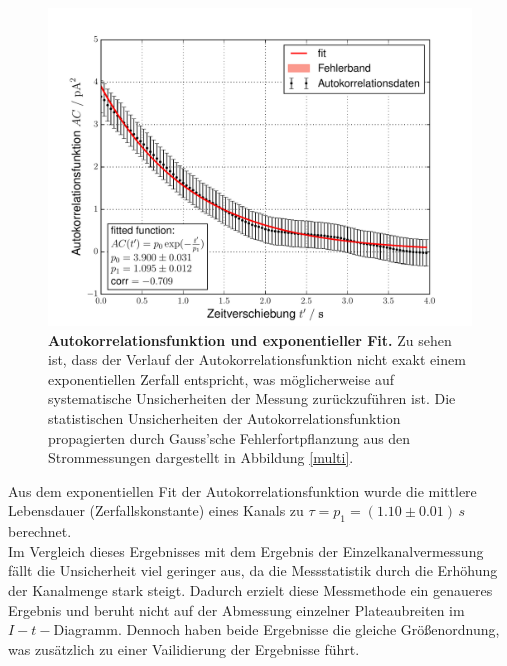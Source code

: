 \documentclass{include/thesisclass3}
\newcommand{\e}[1]{\,\si{#1}}
\begin{document}
\begin{figure}[H]
\centering
\includegraphics[scale=0.7]{images/AC.pdf}
\caption{\textbf{Autokorrelationsfunktion und exponentieller Fit.} Zu sehen ist, dass der Verlauf der Autokorrelationsfunktion nicht exakt einem exponentiellen Zerfall entspricht, was möglicherweise auf systematische Unsicherheiten der Messung zurückzuführen ist. Die statistischen Unsicherheiten der Autokorrelationsfunktion propagierten durch Gauss'sche Fehlerfortpflanzung aus den Strommessungen dargestellt in Abbildung \ref{multi}. }
\label{AC}
\end{figure}
Aus dem exponentiellen Fit der Autokorrelationsfunktion wurde die mittlere Lebensdauer (Zerfallskonstante) eines Kanals zu $\tau = p_1 = (1.10 \pm 0.01)\e{s}$ berechnet.\\
Im Vergleich dieses Ergebnisses mit dem Ergebnis der Einzelkanalvermessung fällt die Unsicherheit viel geringer aus, da die Messstatistik durch die Erhöhung der Kanalmenge stark steigt. Dadurch erzielt diese Messmethode ein genaueres Ergebnis und beruht nicht auf der Abmessung einzelner Plateaubreiten im $I-t-$Diagramm. Dennoch haben beide Ergebnisse die gleiche Größenordnung, was zusätzlich zu einer Vailidierung der Ergebnisse führt.
\end{document}
